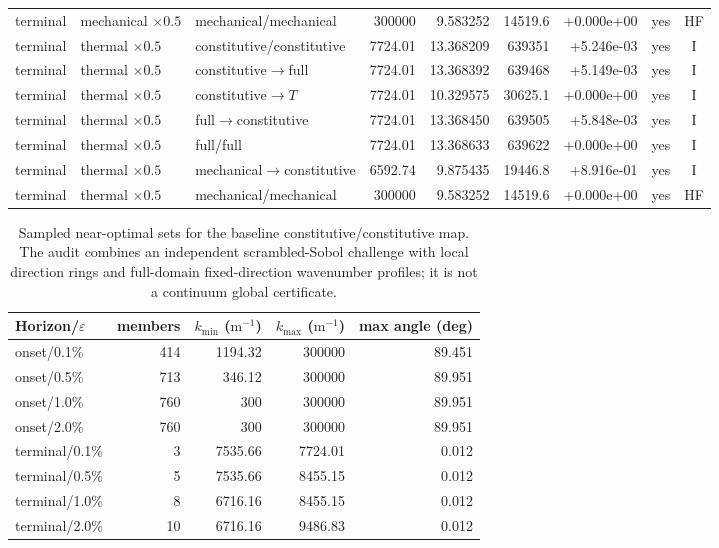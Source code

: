 \begin{landscape}
\begin{longtable}{@{}p{1.15cm}p{2.55cm}p{3.60cm}rrrrcc@{}}
terminal & mechanical $\times0.5$ & mechanical/mechanical & 300000 & 9.583252 & 14519.6 & +0.000e+00 & yes & HF \\
terminal & thermal $\times0.5$ & constitutive/constitutive & 7724.01 & 13.368209 & 639351 & +5.246e-03 & yes & I \\
terminal & thermal $\times0.5$ & constitutive$\rightarrow$full & 7724.01 & 13.368392 & 639468 & +5.149e-03 & yes & I \\
terminal & thermal $\times0.5$ & constitutive$\rightarrow T$ & 7724.01 & 10.329575 & 30625.1 & +0.000e+00 & yes & I \\
terminal & thermal $\times0.5$ & full$\rightarrow$constitutive & 7724.01 & 13.368450 & 639505 & +5.848e-03 & yes & I \\
terminal & thermal $\times0.5$ & full/full & 7724.01 & 13.368633 & 639622 & +0.000e+00 & yes & I \\
terminal & thermal $\times0.5$ & mechanical$\rightarrow$constitutive & 6592.74 & 9.875435 & 19446.8 & +8.916e-01 & yes & I \\
terminal & thermal $\times0.5$ & mechanical/mechanical & 300000 & 9.583252 & 14519.6 & +0.000e+00 & yes & HF \\
\bottomrule
\end{longtable}
\endgroup
\end{landscape}

\begin{table}[ht]
\centering
\caption{Sampled near-optimal sets for the baseline constitutive/constitutive map.  The audit combines an independent scrambled-Sobol challenge with local direction rings and full-domain fixed-direction wavenumber profiles; it is not a continuum global certificate.}
\begin{tabular}{@{}lrrrr@{}}
\toprule
Horizon/$\varepsilon$ & members & $k_{\min}$ ($\mathrm{m^{-1}}$) & $k_{\max}$ ($\mathrm{m^{-1}}$) & max angle (deg) \\
\midrule
onset/0.1\% & 414 & 1194.32 & 300000 & 89.451 \\
onset/0.5\% & 713 & 346.12 & 300000 & 89.951 \\
onset/1.0\% & 760 & 300 & 300000 & 89.951 \\
onset/2.0\% & 760 & 300 & 300000 & 89.951 \\
terminal/0.1\% & 3 & 7535.66 & 7724.01 & 0.012 \\
terminal/0.5\% & 5 & 7535.66 & 8455.15 & 0.012 \\
terminal/1.0\% & 8 & 6716.16 & 8455.15 & 0.012 \\
terminal/2.0\% & 10 & 6716.16 & 9486.83 & 0.012 \\
\bottomrule
\end{tabular}
\end{table}

